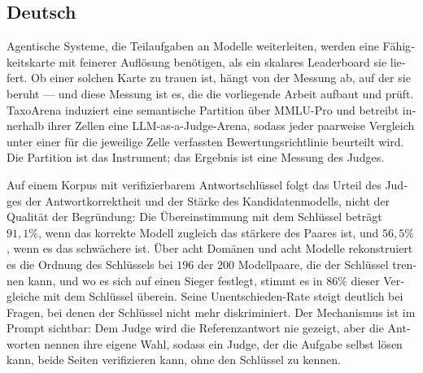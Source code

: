 \begin{otherlanguage}{ngerman}
\section*{Deutsch}
Agentische Systeme, die Teilaufgaben an Modelle weiterleiten, werden
eine Fähigkeitskarte mit feinerer Auflösung benötigen, als ein
skalares Leaderboard sie liefert. Ob einer solchen Karte zu trauen
ist, hängt von der Messung ab, auf der sie beruht --- und diese
Messung ist es, die die vorliegende Arbeit aufbaut und prüft.
TaxoArena induziert eine semantische Partition über MMLU-Pro und
betreibt innerhalb ihrer Zellen eine LLM-as-a-Judge-Arena, sodass
jeder paarweise Vergleich unter einer für die jeweilige Zelle
verfassten Bewertungsrichtlinie beurteilt wird. Die Partition ist das
Instrument; das Ergebnis ist eine Messung des Judges.

Auf einem Korpus mit verifizierbarem Antwortschlüssel folgt das Urteil
des Judges der Antwortkorrektheit und der Stärke des Kandidatenmodells,
nicht der Qualität der Begründung: Die Übereinstimmung mit dem
Schlüssel beträgt $91{,}1\%$, wenn das korrekte Modell zugleich das
stärkere des Paares ist, und $56{,}5\%$, wenn es das schwächere ist.
Über acht Domänen und acht Modelle rekonstruiert es die Ordnung des
Schlüssels bei $196$ der $200$ Modellpaare, die der Schlüssel trennen
kann, und wo es sich auf einen Sieger festlegt, stimmt es in $86\%$
dieser Vergleiche mit dem Schlüssel überein. Seine Unentschieden-Rate
steigt deutlich bei Fragen, bei denen der Schlüssel nicht mehr
diskriminiert. Der Mechanismus ist im Prompt sichtbar: Dem Judge wird
die Referenzantwort nie gezeigt, aber die Antworten nennen ihre eigene
Wahl, sodass ein Judge, der die Aufgabe selbst lösen kann, beide
Seiten verifizieren kann, ohne den Schlüssel zu kennen.


\end{otherlanguage}
